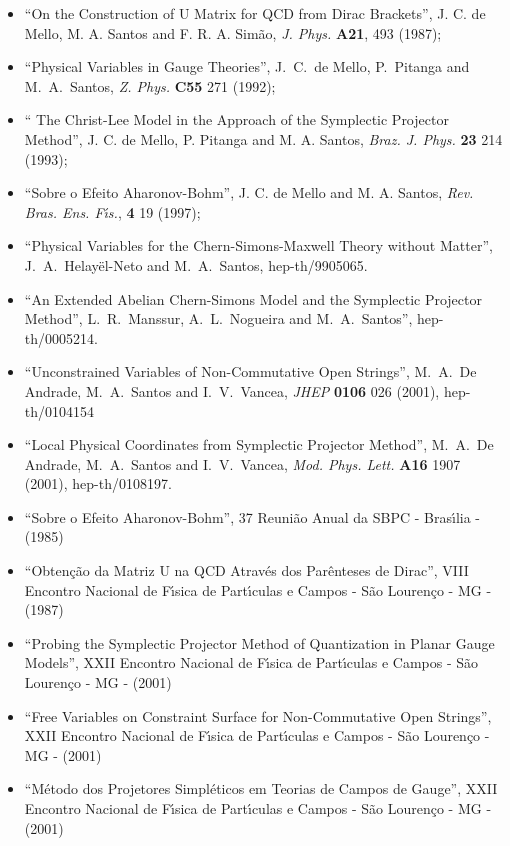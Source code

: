 \documentclass[a4paper,thmsa,12pt]{report}
\begin{document}
\begin{itemize}

\item ``On the Construction of U Matrix for QCD from Dirac Brackets'', 
J. C. de Mello, M. A. Santos and F. R. A. Sim\~ao, 
{\it J. Phys.} {\bf A21}, 493 (1987);

\item ``Physical Variables in Gauge Theories'', 
 J.~C.~de Mello, P.~Pitanga and M.~A.~Santos,
{\it Z. Phys.} {\bf C55} 271 (1992);

\item `` The Christ-Lee Model in the Approach of the Symplectic Projector Method'', 
J. C. de Mello, P. Pitanga and M. A. Santos,
{\it Braz. J. Phys.} {\bf 23} 214 (1993);

\item ``Sobre o Efeito Aharonov-Bohm'',
J. C. de Mello and M. A. Santos,
{\it Rev. Bras. Ens. F\'{\i}s.}, {\bf 4} 19 (1997);

\item ``Physical Variables for the Chern-Simons-Maxwell Theory without Matter'', 
J.~A.~He\-la\-y\"el-Neto and M.~A.~Santos, 
hep-th/9905065.

\item ``An Extended Abelian Chern-Simons Model and the Symplectic Projector Method'',
L.~R.~Manssur, A.~L.~Nogueira and M.~A.~Santos'', 
hep-th/0005214.

\item ``Unconstrained Variables of Non-Commutative Open Strings'', 
M.~A.~De Andrade, M.~A.~Santos and I.~V.~Vancea, {\it JHEP} {\bf 0106} 026 (2001), 
hep-th/0104154

\item ``Local Physical Coordinates from Symplectic Projector Method'', 
M.~A.~De Andrade, M.~A.~Santos and I.~V.~Vancea, 
{\it Mod. Phys. Lett.} {\bf A16} 1907 (2001), 
hep-th/0108197.

\item ``Sobre o Efeito Aharonov-Bohm'', 37\coordHE{} Reuni\~{a}o Anual da SBPC - Bras\'{\i}lia - (1985)

\item ``Obten\c{c}\~{a}o da Matriz U na QCD Atrav\'{e}s dos Par\^{e}nteses de Dirac'', 
VIII Encontro Nacional de F\'{\i}sica de Part\'{\i}culas e Campos - S\~ao Louren\c co - MG - (1987)

\item ``Probing the Symplectic Projector Method of Quantization in Planar Gauge Models'',
XXII Encontro Nacional de F\'{\i}sica de Part\'{\i}culas e Campos - S\~ao Louren\c co - MG - (2001) 

\item ``Free Variables on Constraint Surface for Non-Commutative Open Strings'',
XXII Encontro Nacional de F\'{\i}sica de Part\'{\i}culas e Campos - S\~ao Louren\c co - MG - (2001) 

\item ``M\'etodo dos Projetores Simpl\'eticos em Teorias de Campos de Gauge'',
XXII Encontro Nacional de F\'{\i}sica de Part\'{\i}culas e Campos - S\~ao Louren\c co - MG - (2001) 


\end{itemize}
\end{document}
